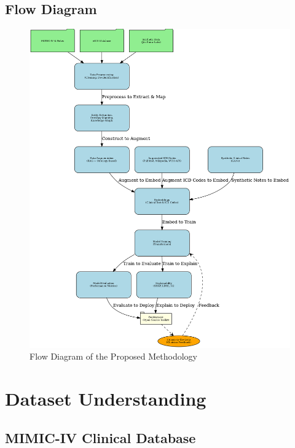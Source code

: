\documentclass[12pt,a4paper]{report}
\begin{document}
\section{Flow Diagram}
\begin{figure}[H]
    \centering
    \includegraphics[width=\textwidth]{methodology_flow_diagram.png}
    \caption{Flow Diagram of the Proposed Methodology}
\end{figure}

\chapter{Dataset Understanding}

\section{MIMIC-IV Clinical Database}
\end{document}
